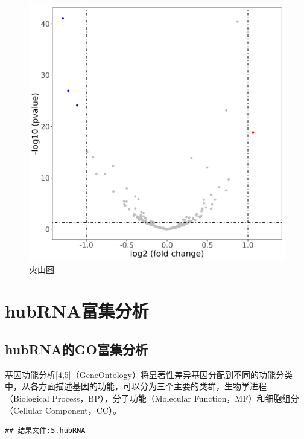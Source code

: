 \documentclass[
]{ctexart}
\begin{document}
\begin{figure}[H]

{\centering \includegraphics[width=1\linewidth]{./1.picture/hubRNA_TVSC.Volcano} 

}

\caption{火山图}\label{fig:unnamed-chunk-15}
\end{figure}

\hypertarget{hubrnaux5bccux96c6ux5206ux6790}{%
\section{hubRNA富集分析}\label{hubrnaux5bccux96c6ux5206ux6790}}

\hypertarget{hubrnaux7684goux5bccux96c6ux5206ux6790}{%
\subsection{hubRNA的GO富集分析}\label{hubrnaux7684goux5bccux96c6ux5206ux6790}}

基因功能分析{[}4,5{]}（GeneOntology）将显著性差异基因分配到不同的功能分类中，从各方面描述基因的功能，可以分为三个主要的类群，生物学进程（Biological Process，BP），分子功能（Molecular Function，MF）和细胞组分（Cellular Component，CC）。

\begin{verbatim}
## 结果文件:5.hubRNA
\end{verbatim}
\end{document}
